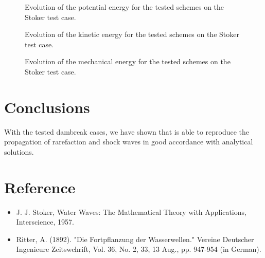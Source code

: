 \begin{figure}[H]
\centering
  \caption{Evolution of the potential energy for the tested schemes on the Stoker test case.}
\label{fig:stoker:Ep}
\end{figure}

\begin{figure}[H]
\centering
  \caption{Evolution of the kinetic energy for the tested schemes on the Stoker test case.}
\label{fig:stoker:Ec}
\end{figure}

\begin{figure}[H]
\centering
  \caption{Evolution of the mechanical energy for the tested schemes on the Stoker test case.}
\label{fig:stoker:Em}
\end{figure}

\section{Conclusions}

With the tested dambreak cases, we have shown that  is able to
reproduce the propagation of rarefaction and shock waves in good accordance with
analytical solutions.

\section{Reference}

\begin{itemize}
\item J. J. Stoker, Water Waves: The Mathematical Theory with Applications, Interscience, 1957.
\item Ritter, A. (1892). "Die Fortpflanzung der Wasserwellen." Vereine Deutscher Ingenieure Zeitswchrift, Vol. 36, No. 2, 33,
13 Aug., pp. 947-954 (in German).
\end{itemize}
